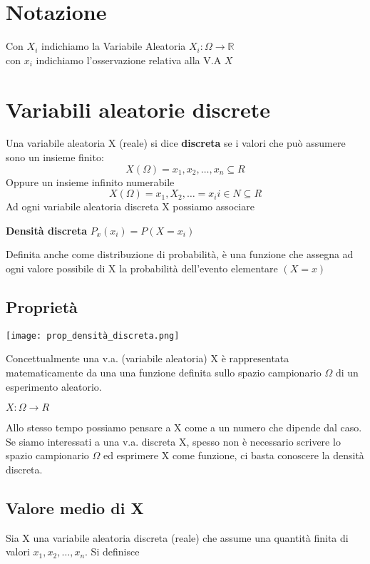 \section{Notazione} Con $X_i$ indichiamo la Variabile Aleatoria $X_i: \Omega \rightarrow \mathbb{R}$
\\ con $x_i$ indichiamo l'osservazione relativa alla V.A $X$

\section{Variabili aleatorie discrete}
Una variabile aleatoria X (reale) si dice \textbf{discreta} se i valori che può
assumere sono un insieme finito:
\begin{equation}
    X(\Omega) = {x_1, x_2, \dots, x_n} \subseteq  R
\end{equation}
Oppure un insieme infinito numerabile
\begin{equation}
    X(\Omega) = {x_1, X_2, \dots } = {x_i} i \in N \subseteq R
\end{equation}
Ad ogni variabile aleatoria discreta X possiamo associare
\begin{center}
    \textbf{Densità discreta} $P_x(x_i) = P(X = x_i)$
\end{center}
Definita anche come distribuzione di probabilità, è una funzione che assegna
ad ogni valore possibile di X la probabilità dell'evento elementare $(X = x)$
\subsection{Proprietà}
\begin{center}
    \texttt{[image: prop\_densità\_discreta.png]}
\end{center}
Concettualmente una v.a. (variabile aleatoria) X è rappresentata matematicamente da una
una funzione definita sullo spazio campionario $\Omega$ di un esperimento aleatorio.
\begin{center}
    $X:\Omega \to R$
\end{center}
Allo stesso tempo possiamo pensare a X come a un numero che dipende dal caso.
Se siamo interessati a una v.a. discreta X, spesso non è necessario scrivere lo
spazio campionario $\Omega$ ed esprimere X come funzione, 
ci basta conoscere la densità discreta.

\subsection{Valore medio di X}
Sia X una variabile aleatoria discreta (reale) che assume una quantità finita di valori
$x_1, x_2, \dots, x_n$. Si definisce

